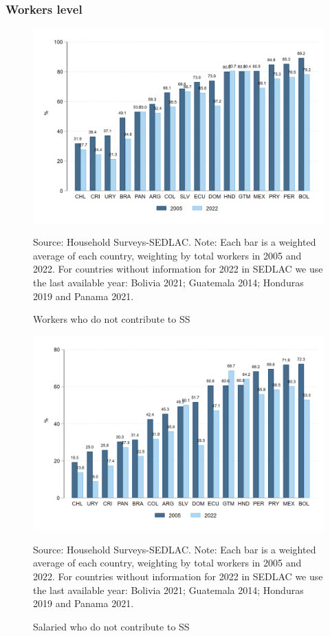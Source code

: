 \documentclass[english]{article}
\begin{document}
\subsubsection{Workers level} 
\begin{figure}[H]
    \justifying
     \caption{Workers who do not contribute to SS}     
     \centerline{\includegraphics[scale=.3]{latex/figures/Snapshot/snapshot_informal_ss.png}
    \label{fig:SalariedSS}}
    \footnotesize{Source: Household Surveys-SEDLAC.}
    \footnotesize{Note: Each bar is a weighted average of each country, weighting by total workers in 2005 and 2022. For countries without information for 2022 in SEDLAC we use the last available year: Bolivia 2021; Guatemala 2014; Honduras 2019 and Panama 2021.}
\end{figure}

\begin{figure}[H]
    \justifying
     \caption{Salaried who do not contribute to SS}     
     \centerline{\includegraphics[scale=.3]{latex/figures/Snapshot/snapshot_informal_ss_dep.png}
    \label{fig:SalariedSS}}
    \footnotesize{Source: Household Surveys-SEDLAC.}
    \footnotesize{Note: Each bar is a weighted average of each country, weighting by total workers in 2005 and 2022. For countries without information for 2022 in SEDLAC we use the last available year: Bolivia 2021; Guatemala 2014; Honduras 2019 and Panama 2021.}
\end{figure}
\end{document}
